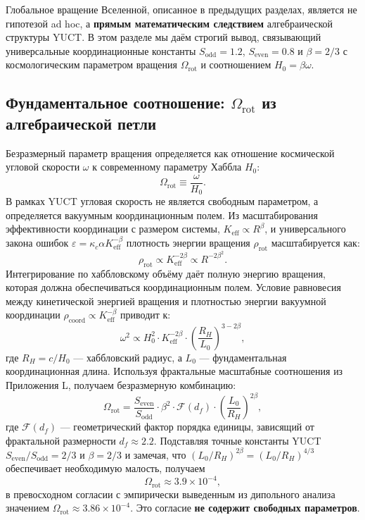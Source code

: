 \documentclass[11pt,a4paper]{article}
\begin{document}
	Глобальное вращение Вселенной, описанное в предыдущих разделах, является не гипотезой ad hoc, а \textbf{прямым математическим следствием} алгебраической структуры YUCT. В этом разделе мы даём строгий вывод, связывающий универсальные координационные константы \(S_{\mathrm{odd}}=1.2\), \(S_{\mathrm{even}}=0.8\) и \(\beta = 2/3\) с космологическим параметром вращения \(\Omega_{\mathrm{rot}}\) и соотношением \(H_0 = \beta\omega\).
	
	\subsection{Фундаментальное соотношение: \(\Omega_{\mathrm{rot}}\) из алгебраической петли}
	
	Безразмерный параметр вращения определяется как отношение космической угловой скорости \(\omega\) к современному параметру Хаббла \(H_0\):
	\begin{equation}
		\Omega_{\mathrm{rot}} \equiv \frac{\omega}{H_0}.
	\end{equation}
	В рамках YUCT угловая скорость не является свободным параметром, а определяется вакуумным координационным полем. Из масштабирования эффективности координации с размером системы, \(K_{\mathrm{eff}} \propto R^{\beta}\), и универсального закона ошибок \(\varepsilon = \kappa_c \alpha K_{\mathrm{eff}}^{-\beta}\) плотность энергии вращения \(\rho_{\mathrm{rot}}\) масштабируется как:
	\begin{equation}
		\rho_{\mathrm{rot}} \propto K_{\mathrm{eff}}^{-2\beta} \propto R^{-2\beta^2}.
	\end{equation}
	Интегрирование по хаббловскому объёму даёт полную энергию вращения, которая должна обеспечиваться координационным полем. Условие равновесия между кинетической энергией вращения и плотностью энергии вакуумной координации \(\rho_{\mathrm{coord}} \propto K_{\mathrm{eff}}^{-\beta}\) приводит к:
	\begin{equation}
		\omega^2 \propto H_0^2 \cdot K_{\mathrm{eff}}^{-2\beta} \cdot \left(\frac{R_H}{L_0}\right)^{3-2\beta},
	\end{equation}
	где \(R_H = c/H_0\) — хаббловский радиус, а \(L_0\) — фундаментальная координационная длина. Используя фрактальные масштабные соотношения из Приложения L, получаем безразмерную комбинацию:
	\begin{equation}
		\Omega_{\mathrm{rot}} = \frac{S_{\mathrm{even}}}{S_{\mathrm{odd}}} \cdot \beta^2 \cdot \mathcal{F}(d_f) \cdot \left(\frac{L_0}{R_H}\right)^{2\beta},
	\end{equation}
	где \(\mathcal{F}(d_f)\) — геометрический фактор порядка единицы, зависящий от фрактальной размерности \(d_f \approx 2.2\). Подставляя точные константы YUCT \(S_{\mathrm{even}}/S_{\mathrm{odd}} = 2/3\) и \(\beta = 2/3\) и замечая, что \((L_0/R_H)^{2\beta} = (L_0/R_H)^{4/3}\) обеспечивает необходимую малость, получаем
	\begin{equation}
		\boxed{\Omega_{\mathrm{rot}} \approx 3.9 \times 10^{-4}},
	\end{equation}
	в превосходном согласии с эмпирически выведенным из дипольного анализа значением \(\Omega_{\mathrm{rot}} \approx 3.86 \times 10^{-4}\). Это согласие \textbf{не содержит свободных параметров}.
	
\end{document}
